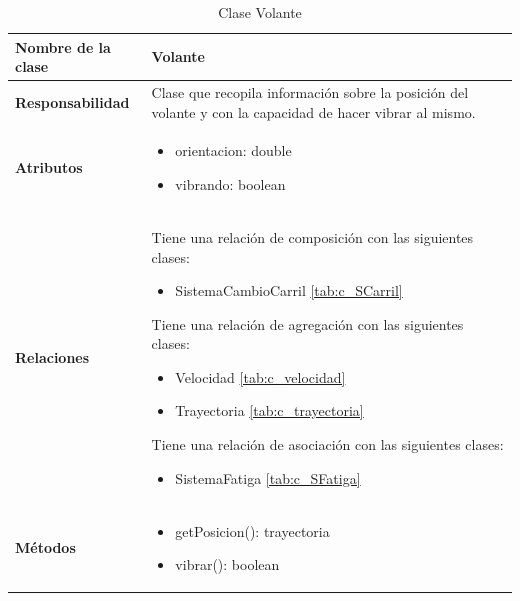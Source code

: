 \begin{table}[h]
\begin{center}
\begin{tabular}{p{} p{11cm}}
\textbf{Nombre de la clase} &  Volante\\ \hline  \hline
\textbf{Responsabilidad} &  Clase que recopila información sobre la posición del volante y con la capacidad de hacer vibrar al mismo.  \\ \hline
\textbf{Atributos} & \begin{itemize}
                      \item orientacion: double
                      \item vibrando: boolean
                    \end{itemize}
                      \\ \hline
\textbf{Relaciones} & \par Tiene una relación de composición con las siguientes clases:
                      \begin{itemize}
                        \item SistemaCambioCarril \ref{tab:c_SCarril}
                      \end{itemize}

                      \par Tiene una relación de agregación con las siguientes clases:
                      \begin{itemize}
                        \item Velocidad \ref{tab:c_velocidad}
                        \item Trayectoria \ref{tab:c_trayectoria}
                      \end{itemize}

                      \par Tiene una relación de asociación con las siguientes clases:
                      \begin{itemize}
                        \item SistemaFatiga \ref{tab:c_SFatiga}
                      \end{itemize}

                      \\ \hline



\textbf{Métodos} &  \begin{itemize}
                      \item getPosicion(): trayectoria
                      \item vibrar(): boolean
                    \end{itemize}\\ \hline
\end{tabular}
\caption{Clase Volante}
\label{tab:c_Volante}
\end{center}
\end{table}









